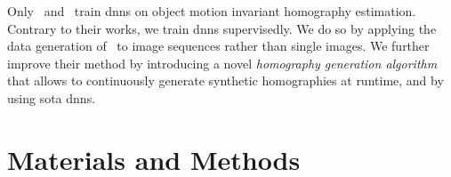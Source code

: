 Only~\cite{le2020deep} and~\cite{zhang2020content} train \gls{dnn}s on object motion invariant homography estimation. Contrary to their works, we train \gls{dnn}s supervisedly. We do so by applying the data generation of~\cite{detone2016deep} to image sequences rather than single images. We further improve their method by introducing a novel \textit{homography generation algorithm} that allows to continuously generate synthetic homographies at runtime, and by using \gls{sota} \gls{dnn}s.

\section{Materials and Methods}

